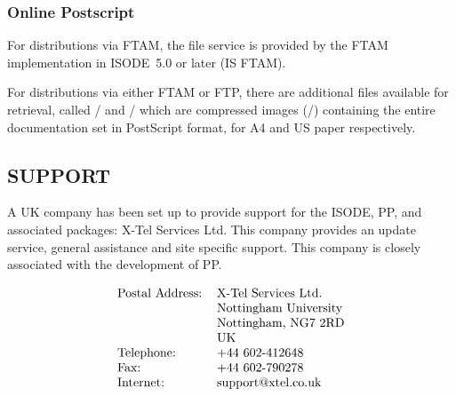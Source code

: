 \subsubsection*{Online Postscript}

For distributions via FTAM,
the file service is provided by the FTAM implementation in ISODE~5.0 or later
(IS FTAM).

For distributions via either FTAM or FTP, there are additional files
available for retrieval, called \ukpsfile/  and \psfile/
which are compressed  images (\pssize/) containing the entire
documentation set in PostScript format, 
for A4 and US paper respectively.   

\subsection*{SUPPORT}

A UK company has been set up to provide support for the ISODE, PP,
and associated packages: X-Tel Services Ltd.  This company provides an
update service, general assistance and site specific support.
This company is closely associated with the development of PP.

\[\begin{tabular}{ll}
Postal Address:&	X-Tel Services Ltd.\\
&		Nottingham University\\
&		Nottingham, NG7 2RD\\
&	        UK\\
Telephone:&	+44 602-412648\\
Fax:&		+44 602-790278\\
Internet:&	support@xtel.co.uk\\
\end{tabular}\]
